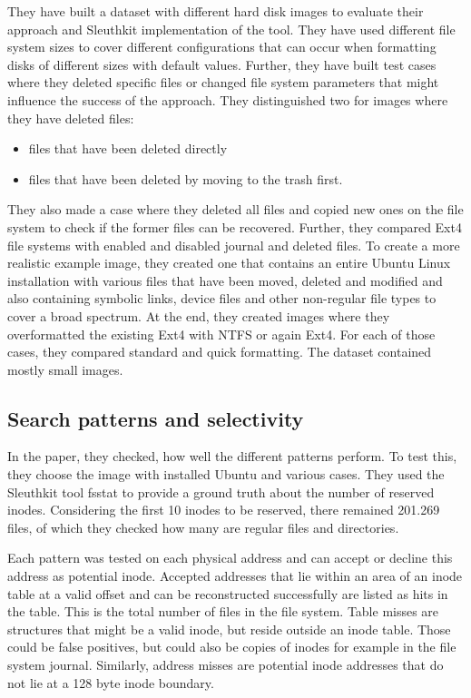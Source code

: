 \documentclass{acm_proc_article-sp}
\begin{document}
They have built a dataset with different hard disk images to evaluate their approach and Sleuthkit implementation of the tool. They have used different file system sizes to cover different configurations that can occur when formatting disks of different sizes with default values. 
Further, they have built test cases where they deleted specific files or changed file system parameters that might influence the success of the approach.
They distinguished two for images where they have deleted files:
\begin{itemize}
\item files that have been deleted directly
\item files that have been deleted by moving to the trash first.
\end{itemize}
They also made a case where they deleted all files and copied new ones on the file system to check if the former files can be recovered.
Further, they compared Ext4 file systems with enabled and
disabled journal and deleted files. To create a more realistic
example image, they created one that contains an entire Ubuntu
Linux installation with various files that have been moved, deleted
and modified and also containing symbolic links, device files and
other non-regular file types to cover a broad spectrum.
At the end, they created images where they overformatted the existing Ext4 with NTFS or again Ext4. For each of those cases, they compared standard and quick formatting. The dataset contained mostly small images.

\subsection{Search patterns and selectivity}

In the paper, they checked, how well the different patterns perform. 
To test this, they choose the image with installed Ubuntu and various cases. They used the Sleuthkit tool fsstat to provide a ground truth about the number of reserved inodes.
Considering the first 10 inodes to be reserved, there remained 201.269 files, of which they checked how many are regular files and directories.

Each pattern was tested on each physical address and can accept or decline this address as potential inode. Accepted addresses that lie within an area of an inode table at a valid offset and can be reconstructed successfully are listed as hits in the table. This is the total number of files in the file system. Table misses are structures that might be a valid inode, but reside outside an inode table. Those could be false positives, but could also be copies of inodes for example in the file system journal. Similarly, address misses are potential inode addresses that do not lie at a 128 byte inode boundary.
\end{document}
